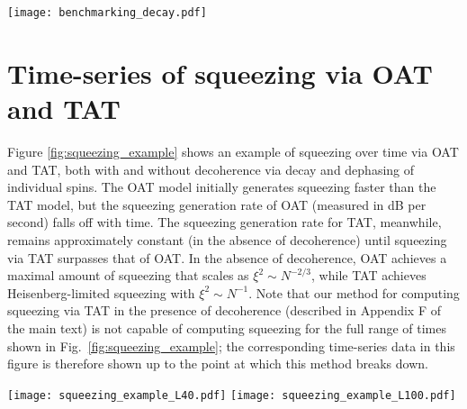 \documentclass[aps,prx,superscriptaddress,notitlepage,onecolumn,12pt]{revtex4-1}
\renewcommand{\t}{\text} %
\begin{document}
\begin{figure*}
\centering
\texttt{[image: benchmarking\_decay.pdf]}
\caption{{\bf Comparison between the OAT and the spin model in the presence of decoherence.}
({\bf a}) The difference between the maximal squeezing (measured in dB) obtained by the OAT [Eqn.~(3)] and spin [Eqn.~(2)] models increases with the particle number $N$ and the single-particle spontaneous emission rate $\gamma$.
This disagreement is attributed in part to the fact that spontaneous emission transfers population of the collective spin state outside of the Dicke manifold, violating an assumption of the OAT model; see panel ({\bf b}).
The rate of population transfer outside of the Dicke manifold increases with both particle number and spontaneous emission rate.
(Parameters for simulations in this figure: $U=1000$ Hz, $J=200$ Hz, and $\phi=\pi/20$).
}
\label{fig:benchmarking_decay}
\end{figure*}


\section{Time-series of squeezing via OAT and TAT}

Figure \ref{fig:squeezing_example} shows an example of squeezing over time via OAT and TAT, both with and without decoherence via decay and dephasing of individual spins.
The OAT model initially generates squeezing faster than the TAT model, but the squeezing generation rate of OAT (measured in dB per second) falls off with time.
The squeezing generation rate for TAT, meanwhile, remains approximately constant (in the absence of decoherence) until squeezing via TAT surpasses that of OAT.
In the absence of decoherence, OAT achieves a maximal amount of squeezing that scales as $\xi^2\sim N^{-2/3}$, while TAT achieves Heisenberg-limited squeezing with $\xi^2\sim N^{-1}$.
Note that our method for computing squeezing via TAT in the presence of decoherence (described in Appendix F of the main text) is not capable of computing squeezing for the full range of times shown in Fig.~\ref{fig:squeezing_example}; the corresponding time-series data in this figure is therefore shown up to the point at which this method breaks down.

\begin{figure*}
\centering
\texttt{[image: squeezing\_example\_L40.pdf]}
\texttt{[image: squeezing\_example\_L100.pdf]}
\caption{{\bf Squeezing via OAT and TAT} in a 2D section of the 3D $^{87}$Sr optical lattice clock, shown for ({\bf a}) $\ell=40$ and ({\bf b}) $\ell=100$ sites per axis (with $N=\ell^2$ atoms total), and a lattice depth of $V_0=4~E_{\t{R}}$, where $E_{\t{R}}$ is the atomic lattice recoil energy.
Atoms are confined along the direction transverse to the 2D layer by a lattice of depth 60 $E_{\t{R}}$.
Squeezing over time is shown for OAT (blue) and TAT (green), both with (solid lines) and without (dashed lines) decoherence via uncorrelated decay and dephasing of individual spins at rates of $0.1~\t{sec}^{-1}$ (see Appendix E of the main text).
}
\label{fig:squeezing_example}
\end{figure*}
\end{document}
